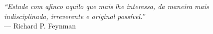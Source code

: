 \begin{epigrafe}
  \vspace*{\fill}
  \begin{flushright}
    \begin{SingleSpace}





      \textit{``Estude com afinco aquilo que mais lhe interessa, da maneira mais indisciplinada, irreverente e original possível.''} \\
      --- Richard P. Feynman

    \end{SingleSpace}
  \end{flushright}
\end{epigrafe}